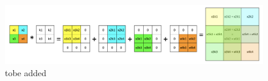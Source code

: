 
\begin{figure}[!ht]
    \centering
    \includegraphics[width=5.5in]{figures/transpose_convo1.png}
    \caption{{\color{red} tobe added}}  \label{fig:transpose_convo}
\end{figure}

